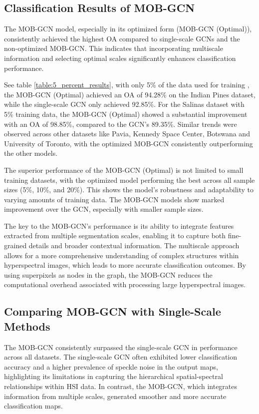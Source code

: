 \subsection{Classification Results of MOB-GCN} 

The MOB-GCN model, especially in its optimized form (MOB-GCN (Optimal)), consistently achieved the highest OA compared to single-scale GCNs and the non-optimized MOB-GCN. This indicates that incorporating multiscale information and selecting optimal scales significantly enhances classification performance.

See table \ref{table:5_percent_results}, with only 5\% of the data used for training , the MOB-GCN (Optimal) achieved an OA of 94.28\% on the Indian Pines dataset, while the single-scale GCN only achieved 92.85\%. For the Salinas dataset with 5\% training data, the MOB-GCN (Optimal) showed a substantial improvement with an OA of 98.85\%, compared to the GCN's 89.35\%. Similar trends were observed across other datasets like Pavia, Kennedy Space Center, Botswana and University of Toronto, with the optimized MOB-GCN consistently outperforming the other models.

The superior performance of the MOB-GCN (Optimal) is not limited to small training datasets, with the optimized model performing the best across all sample sizes (5\%, 10\%, and 20\%). This shows the model's robustness and adaptability to varying amounts of training data. The MOB-GCN models show marked improvement over the GCN, especially with smaller sample sizes.

The key to the MOB-GCN's performance is its ability to integrate features extracted from multiple segmentation scales, enabling it to capture both fine-grained details and broader contextual information. The multiscale approach allows for a more comprehensive understanding of complex structures within hyperspectral images, which leads to more accurate classification outcomes. By using superpixels as nodes in the graph, the MOB-GCN reduces the computational overhead associated with processing large hyperspectral images\cite{sellars2020}. 

\subsection{Comparing MOB-GCN with Single-Scale Methods}

The MOB-GCN consistently surpassed the single-scale GCN in performance across all datasets. The single-scale GCN often exhibited lower classification accuracy and a higher prevalence of speckle noise in the output maps, highlighting its limitations in capturing the hierarchical
spatial-spectral relationships within HSI data. In contrast, the MOB-GCN, which integrates information from multiple scales, generated smoother and more accurate classification maps.

